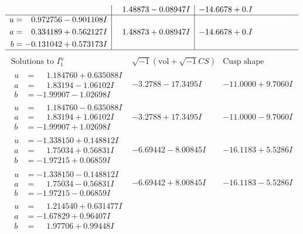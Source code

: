 \documentclass[1p]{elsarticle_modified}
\theoremstyle{definition}
\newcommand{\I}{\sqrt{-1}}
\begin{document}
$$\begin{array}{c|c|c}
 & \phantom{-}1.48873 - 0.08947 I & -14.6678 + 0. I\phantom{ +0.000000I} \\ \hline\begin{aligned}
u &= \phantom{-}0.972756 - 0.901108 I \\
a &= \phantom{-}0.334189 + 0.562127 I \\
b &= -0.131042 + 0.573173 I\end{aligned}
 & \phantom{-}1.48873 + 0.08947 I & -14.6678 + 0. I\phantom{ +0.000000I}\\
 \hline 
 \end{array}$$\newpage$$\begin{array}{c|c|c}  
\text{Solutions to }I^u_{1}& \I (\text{vol} + \sqrt{-1}CS) & \text{Cusp shape}\\
 \hline 
\begin{aligned}
u &= \phantom{-}1.184760 + 0.635088 I \\
a &= \phantom{-}1.83194 - 1.06102 I \\
b &= -1.99907 - 1.02698 I\end{aligned}
 & -3.2788 - 17.3495 I & -11.0000 + 9.7060 I \\ \hline\begin{aligned}
u &= \phantom{-}1.184760 - 0.635088 I \\
a &= \phantom{-}1.83194 + 1.06102 I \\
b &= -1.99907 + 1.02698 I\end{aligned}
 & -3.2788 + 17.3495 I & -11.0000 - 9.7060 I \\ \hline\begin{aligned}
u &= -1.338150 + 0.148812 I \\
a &= \phantom{-}1.75034 + 0.56831 I \\
b &= -1.97215 + 0.06859 I\end{aligned}
 & -6.69442 - 8.00845 I & -16.1183 + 5.5286 I \\ \hline\begin{aligned}
u &= -1.338150 - 0.148812 I \\
a &= \phantom{-}1.75034 - 0.56831 I \\
b &= -1.97215 - 0.06859 I\end{aligned}
 & -6.69442 + 8.00845 I & -16.1183 - 5.5286 I \\ \hline\begin{aligned}
u &= \phantom{-}1.214540 + 0.631477 I \\
a &= -1.67829 + 0.96407 I \\
b &= \phantom{-}1.97706 + 0.99448 I\end{aligned}

\end{array}$$
\end{document}
